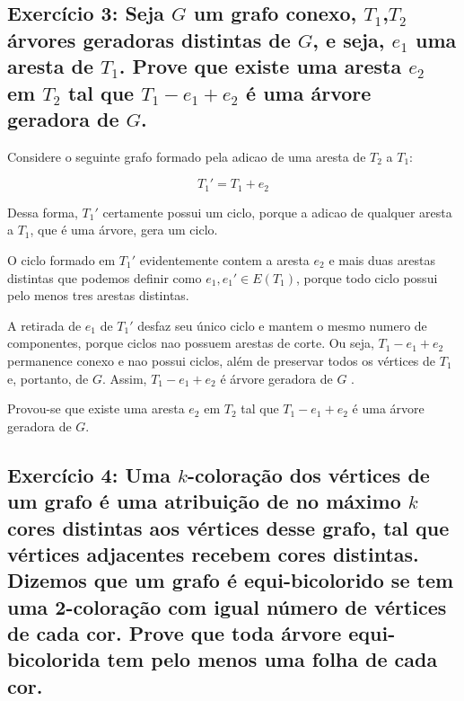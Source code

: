 \documentclass{article}
\begin{document}
 
 
 
 

\clearpage



\subsection{Exercício 3: Seja $G$ um grafo conexo, $T_1$,$T_2$ árvores geradoras distintas de $G$, e seja, $e_1$ uma aresta de $T_1$. Prove que existe uma aresta $e_2$ em $T_2$ tal que $T_1 - e_1 + e_2$ é uma árvore geradora de $G$.}

Considere o seguinte grafo formado pela adicao de uma aresta de $T_2$ a $T_1$:

 $$
 T_1' = T_1 + e_2
 $$
 
Dessa forma, $T_1'$ certamente possui um ciclo, porque a adicao de qualquer aresta a $T_1$, que é uma árvore, gera um ciclo.

O ciclo formado em $T_1'$ evidentemente contem a aresta $e_2$ e mais duas arestas distintas que podemos definir como $e_1, e_1' \in E(T_1)$, porque todo ciclo possui pelo menos tres arestas distintas.


A retirada de $e_1$ de $T_1'$ desfaz seu único ciclo e mantem o mesmo numero de componentes, porque ciclos nao possuem arestas de corte. Ou seja, $T_1 - e_1 + e_2$ permanence conexo e nao possui ciclos, além de preservar todos os vértices de $T_1$ e, portanto, de $G$. Assim, $T_1 - e_1 + e_2$ é árvore geradora de $G$ .

Provou-se que existe uma aresta $e_2$ em $T_2$ tal que $T_1 - e_1 + e_2$ é uma árvore geradora de $G$.
\clearpage

 \subsection{Exercício 4: Uma $k$-coloração dos vértices de um grafo é uma atribuição de no máximo $k$ cores distintas aos vértices desse grafo, tal que vértices adjacentes recebem cores distintas. Dizemos que um grafo é equi-bicolorido se tem uma 2-coloração com igual número de vértices de cada cor. Prove que toda árvore equi-bicolorida tem pelo menos uma folha de cada cor.}
 
\end{document}
